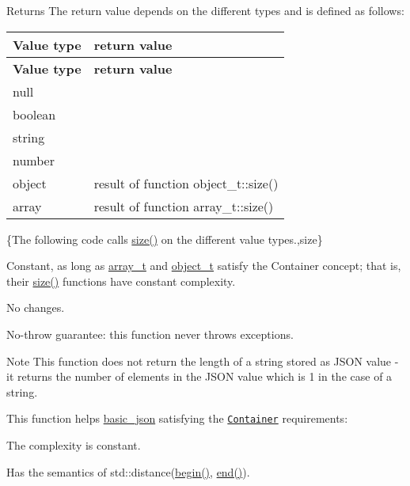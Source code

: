 \begin{DoxyReturn}{Returns}
The return value depends on the different types and is defined as follows\+: \tabulinesep=1mm
\begin{longtabu} spread 0pt [c]{*{2}{|X[-1]}|}
\hline
\rowcolor{\tableheadbgcolor}\textbf{ Value type  }&\textbf{ return value   }\\
\endfirsthead
\hline
\endfoot
\hline
\rowcolor{\tableheadbgcolor}\textbf{ Value type  }&\textbf{ return value   }\\
\endhead
null  &{}   \\
boolean  &{}   \\
string  &{}   \\
number  &{}   \\
object  &result of function object\+\_\+t\+::size()   \\
array  &result of function array\+\_\+t\+::size()   \\
\end{longtabu}

\end{DoxyReturn}
\{The following code calls {\ttfamily \mbox{\hyperlink{classnlohmann_1_1basic__json_a25e27ad0c6d53c01871c5485e1f75b96}{size()}}} on the different value types.,size\}

Constant, as long as \mbox{\hyperlink{classnlohmann_1_1basic__json_ae095578e03df97c5b3991787f1056374}{array\+\_\+t}} and \mbox{\hyperlink{classnlohmann_1_1basic__json_a5e48a7893520e1314bf0c9723e26ea2a}{object\+\_\+t}} satisfy the Container concept; that is, their \mbox{\hyperlink{classnlohmann_1_1basic__json_a25e27ad0c6d53c01871c5485e1f75b96}{size()}} functions have constant complexity.

No changes.

No-\/throw guarantee\+: this function never throws exceptions.

\begin{DoxyNote}{Note}
This function does not return the length of a string stored as J\+S\+ON value -\/ it returns the number of elements in the J\+S\+ON value which is 1 in the case of a string.
\end{DoxyNote}
This function helps {\ttfamily \mbox{\hyperlink{classnlohmann_1_1basic__json}{basic\+\_\+json}}} satisfying the \href{https://en.cppreference.com/w/cpp/named_req/Container}{\tt Container} requirements\+:
\begin{DoxyItemize}
\item The complexity is constant.
\item Has the semantics of {\ttfamily std\+::distance(\mbox{\hyperlink{classnlohmann_1_1basic__json_a0ff28dac23f2bdecee9564d07f51dcdc}{begin()}}, \mbox{\hyperlink{classnlohmann_1_1basic__json_a13e032a02a7fd8a93fdddc2fcbc4763c}{end()}})}.
\end{DoxyItemize}

